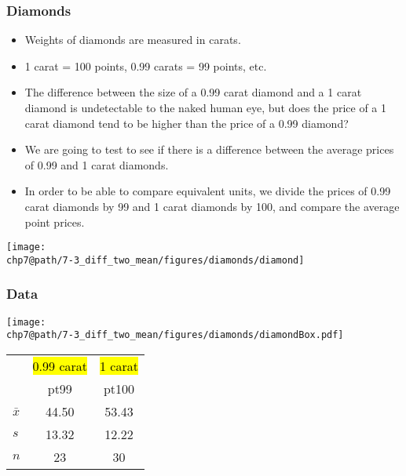 \documentclass[slidestop,compress,mathserif]{beamer}
\makeatletter
\def\chp7@path{../../Chp 7}
\makeatother
\begin{document}

\begin{frame}
\frametitle{Diamonds}

\begin{itemize}

\item Weights of diamonds are measured in carats. 

\item 1 carat = 100 points, 0.99 carats = 99 points, etc.

\item The difference between the size of a 0.99 carat diamond and a 1 carat diamond is undetectable to the naked human eye, but does the price of a 1 carat diamond tend to be higher than the price of a 0.99 diamond?

\item We are going to test to see if there is a difference between the average prices of 0.99 and 1 carat diamonds.

\item In order to be able to compare equivalent units, we divide the prices of 0.99 carat diamonds by 99 and 1 carat diamonds by 100, and compare the average point prices.

\end{itemize}

\hfill \texttt{[image: \\chp7@path/7-3\_diff\_two\_mean/figures/diamonds/diamond]}

\end{frame}


\begin{frame}[fragile]
\frametitle{Data}

\begin{center}
\texttt{[image: \\chp7@path/7-3\_diff\_two\_mean/figures/diamonds/diamondBox.pdf]}
\end{center}

{\small
\begin{center}
\begin{tabular}{l | c | c}
		& {\footnotesize \hl{0.99 carat}} &  {\footnotesize \hl{1 carat}}  \\
		& pt99	& pt100 \\
\hline
$\bar{x}$	& 44.50		& 53.43 \\
$s$		& 13.32		& 12.22 \\
$n$		& 23			& 30
\end{tabular}
\end{center}
}


\end{frame}
\end{document}
